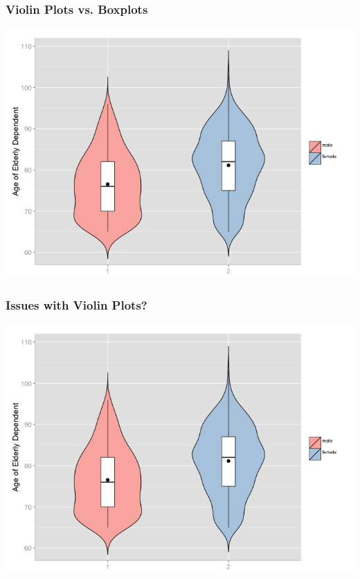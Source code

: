 \documentclass{beamer} %
\begin{document}
\begin{frame}\frametitle{Violin Plots vs. Boxplots}
	\centering
	\includegraphics[width=\linewidth]{violin.png}
\end{frame}




\begin{frame}\frametitle{Issues with Violin Plots?}
	\centering
	\includegraphics[width=\linewidth]{violin.png}
\end{frame}
\end{document}
